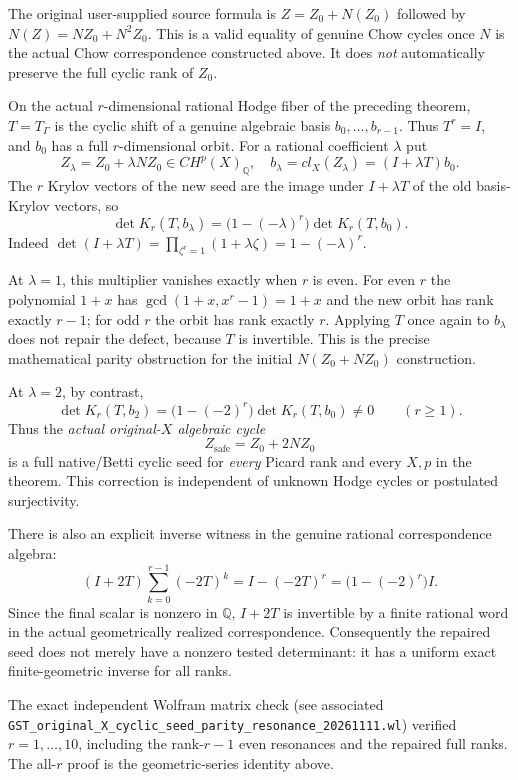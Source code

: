 \documentclass[11pt]{article}
\begin{document}
The original user-supplied source formula is
$Z=Z_0+N(Z_0)$ followed by $N(Z)=NZ_0+N^2Z_0$.
This is a valid equality of genuine Chow cycles once $N$ is the
actual Chow correspondence constructed above. It does \emph{not}
automatically preserve the full cyclic rank of $Z_0$.

On the actual $r$-dimensional rational Hodge fiber of the preceding
theorem, $T=T_\Gamma$ is the cyclic shift of a genuine algebraic
basis $b_0,\ldots,b_{r-1}$. Thus $T^r=I$, and
$b_0$ has a full $r$-dimensional orbit.
For a rational coefficient $\lambda$ put
\[
Z_\lambda=Z_0+\lambda N Z_0\in CH^p(X)_{\mathbb Q},
\quad b_\lambda=cl_X(Z_\lambda)=(I+\lambda T)b_0.
\]
The $r$ Krylov vectors of the new seed are the image under
$I+\lambda T$ of the old basis-Krylov vectors, so
\[
\boxed{
\det K_r(T,b_\lambda)
=
\bigl(1-(-\lambda)^r\bigr)\det K_r(T,b_0).
}
\]
Indeed $\det(I+\lambda T)=\prod_{\zeta^r=1}
(1+\lambda\zeta)=1-(-\lambda)^r$.

At $\lambda=1$, this multiplier vanishes exactly when $r$ is even.
For even $r$ the polynomial $1+x$ has
$\gcd(1+x,x^r-1)=1+x$ and the new orbit has rank exactly $r-1$;
for odd $r$ the orbit has rank exactly $r$.
Applying $T$ once again to $b_\lambda$ does not repair the
defect, because $T$ is invertible. This is the precise mathematical
parity obstruction for the initial $N(Z_0+NZ_0)$ construction.

At $\lambda=2$, by contrast,
\[
\det K_r(T,b_2)
=\bigl(1-(-2)^r\bigr)\det K_r(T,b_0)\ne0
\qquad (r\ge1).
\]
Thus the \emph{actual original-$X$ algebraic cycle}
\[
\boxed{Z_{\mathrm{safe}}=Z_0+2N Z_0}
\]
is a full native/Betti cyclic seed for \emph{every} Picard rank
and every $X,p$ in the theorem.
This correction is independent of unknown Hodge cycles or
postulated surjectivity.

There is also an explicit inverse witness in the genuine
rational correspondence algebra:
\[
(I+2T)\sum_{k=0}^{r-1}(-2T)^k
=I-(-2T)^r
=\bigl(1-(-2)^r\bigr)I.
\]
Since the final scalar is nonzero in $\mathbb Q$,
$I+2T$ is invertible by a finite rational word in the actual
geometrically realized correspondence. Consequently the repaired
seed does not merely have a nonzero tested determinant: it has
a uniform exact finite-geometric inverse for all ranks.

The exact independent Wolfram matrix check (see associated
\texttt{GST\_original\_X\_cyclic\_seed\_parity\_resonance\_20261111.wl})
verified $r=1,\ldots,10$, including the rank-$r-1$ even
resonances and the repaired full ranks.
The all-$r$ proof is the geometric-series identity above.
\end{document}
